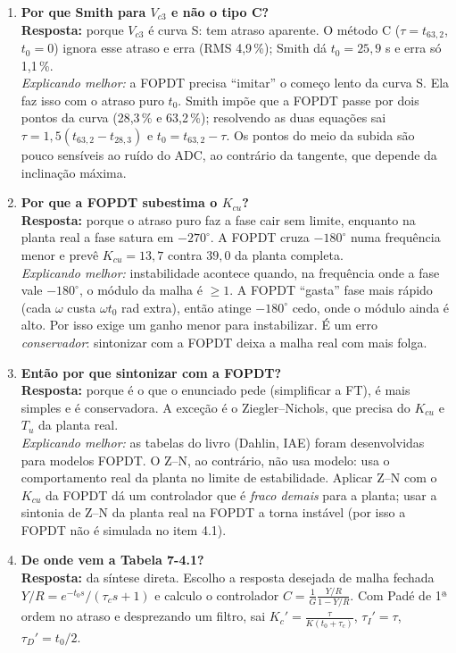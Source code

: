 \documentclass[11pt,a4paper]{article}
\newcommand{\Vc}[1]{V_{c#1}}
\begin{document}
\begin{enumerate}[leftmargin=*]
\item \textbf{Por que Smith para $\Vc3$ e não o tipo C?}\\
\textbf{Resposta:} porque $\Vc3$ é curva S: tem atraso aparente. O método C ($\tau=t_{63,2}$, $t_0=0$) ignora esse atraso e erra (RMS 4,9\,\%); Smith dá $t_0=25{,}9$ s e erra só 1,1\,\%.\\
\emph{Explicando melhor:} a FOPDT precisa ``imitar'' o começo lento da curva S. Ela faz isso com o atraso puro $t_0$. Smith impõe que a FOPDT passe por dois pontos da curva (28,3\,\% e 63,2\,\%); resolvendo as duas equações sai $\tau=1{,}5(t_{63,2}-t_{28,3})$ e $t_0=t_{63,2}-\tau$. Os pontos do meio da subida são pouco sensíveis ao ruído do ADC, ao contrário da tangente, que depende da inclinação máxima.
\item \textbf{Por que a FOPDT subestima o $K_{cu}$?}\\
\textbf{Resposta:} porque o atraso puro faz a fase cair sem limite, enquanto na planta real a fase satura em $-270^\circ$. A FOPDT cruza $-180^\circ$ numa frequência menor e prevê $K_{cu}=13{,}7$ contra $39{,}0$ da planta completa.\\
\emph{Explicando melhor:} instabilidade acontece quando, na frequência onde a fase vale $-180^\circ$, o módulo da malha é $\ge1$. A FOPDT ``gasta'' fase mais rápido (cada $\omega$ custa $\omega t_0$ rad extra), então atinge $-180^\circ$ cedo, onde o módulo ainda é alto. Por isso exige um ganho menor para instabilizar. É um erro \emph{conservador}: sintonizar com a FOPDT deixa a malha real com mais folga.
\item \textbf{Então por que sintonizar com a FOPDT?}\\
\textbf{Resposta:} porque é o que o enunciado pede (simplificar a FT), é mais simples e é conservadora. A exceção é o Ziegler--Nichols, que precisa do $K_{cu}$ e $T_u$ da planta real.\\
\emph{Explicando melhor:} as tabelas do livro (Dahlin, IAE) foram desenvolvidas para modelos FOPDT. O Z--N, ao contrário, não usa modelo: usa o comportamento real da planta no limite de estabilidade. Aplicar Z--N com o $K_{cu}$ da FOPDT dá um controlador que é \emph{fraco demais} para a planta; usar a sintonia de Z--N da planta real na FOPDT a torna instável (por isso a FOPDT não é simulada no item 4.1).
\item \textbf{De onde vem a Tabela 7-4.1?}\\
\textbf{Resposta:} da síntese direta. Escolho a resposta desejada de malha fechada $Y/R=e^{-t_0s}/(\tau_cs+1)$ e calculo o controlador $C=\frac1G\frac{Y/R}{1-Y/R}$. Com Padé de 1ª ordem no atraso e desprezando um filtro, sai $K_c'=\frac{\tau}{K(t_0+\tau_c)}$, $\tau_I'=\tau$, $\tau_D'=t_0/2$.\\

\end{enumerate}
\end{document}
